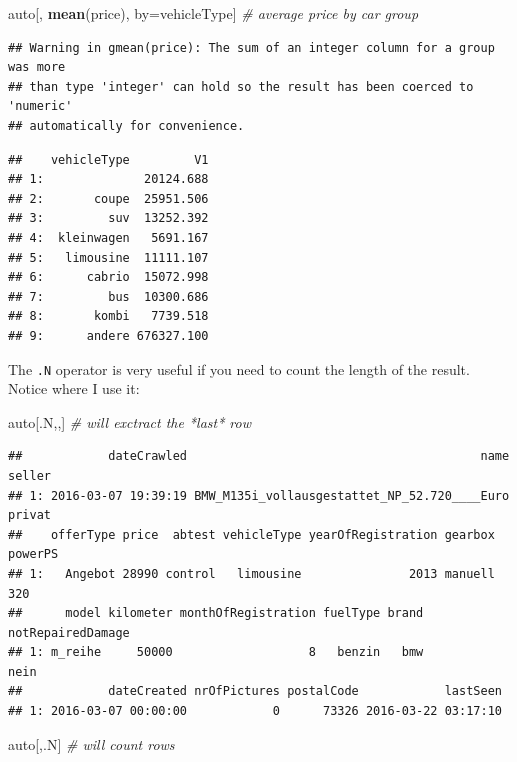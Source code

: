 \documentclass[]{book}
\newenvironment{Shaded}{\begin{snugshade}}{\end{snugshade}}
\newcommand{\CommentTok}[1]{\textcolor[rgb]{0.56,0.35,0.01}{\textit{#1}}}
\newcommand{\KeywordTok}[1]{\textcolor[rgb]{0.13,0.29,0.53}{\textbf{#1}}}
\newcommand{\NormalTok}[1]{#1}
\theoremstyle{definition}
\theoremstyle{definition}
\theoremstyle{definition}
\theoremstyle{remark}
\begin{document}
\begin{Shaded}
\begin{Highlighting}[]
\NormalTok{auto[, }\KeywordTok{mean}\NormalTok{(price), by=vehicleType] }\CommentTok{# average price by car group}
\end{Highlighting}
\end{Shaded}

\begin{verbatim}
## Warning in gmean(price): The sum of an integer column for a group was more
## than type 'integer' can hold so the result has been coerced to 'numeric'
## automatically for convenience.
\end{verbatim}

\begin{verbatim}
##    vehicleType         V1
## 1:              20124.688
## 2:       coupe  25951.506
## 3:         suv  13252.392
## 4:  kleinwagen   5691.167
## 5:   limousine  11111.107
## 6:      cabrio  15072.998
## 7:         bus  10300.686
## 8:       kombi   7739.518
## 9:      andere 676327.100
\end{verbatim}

The \texttt{.N} operator is very useful if you need to count the length of the result.
Notice where I use it:

\begin{Shaded}
\begin{Highlighting}[]
\NormalTok{auto[.N,,] }\CommentTok{# will exctract the *last* row}
\end{Highlighting}
\end{Shaded}

\begin{verbatim}
##            dateCrawled                                         name seller
## 1: 2016-03-07 19:39:19 BMW_M135i_vollausgestattet_NP_52.720____Euro privat
##    offerType price  abtest vehicleType yearOfRegistration gearbox powerPS
## 1:   Angebot 28990 control   limousine               2013 manuell     320
##      model kilometer monthOfRegistration fuelType brand notRepairedDamage
## 1: m_reihe     50000                   8   benzin   bmw              nein
##            dateCreated nrOfPictures postalCode            lastSeen
## 1: 2016-03-07 00:00:00            0      73326 2016-03-22 03:17:10
\end{verbatim}

\begin{Shaded}
\begin{Highlighting}[]
\NormalTok{auto[,.N] }\CommentTok{# will count rows}
\end{Highlighting}
\end{Shaded}
\end{document}
